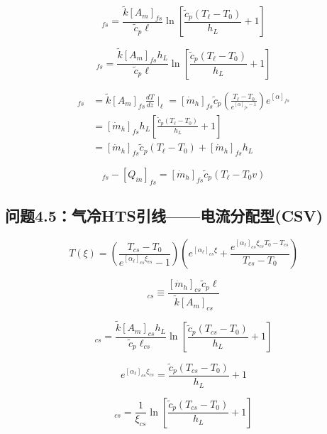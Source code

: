 \begin{equation}
[\dot{m}_h]_{fs}=\frac{\tilde{k}[A_m]_{fs}}{\tilde{c}_p\ell}\ln\left[\frac{\tilde{c}_p(T_\ell-T_0)}{h_L}+1\right]
\end{equation}

\begin{equation}%
[Q_{in}]_{fs}=\frac{\tilde{k}[A_m]_{fs}h_L}{\tilde{c}_p\ell}\ln\left[\frac{\tilde{c}_p(T_\ell-T_0)}{h_L}+1\right]
\end{equation}

\begin{align*}
[Q_\ell]_{fs}&=\tilde{k}[A_m]_{fs}\frac{dT}{dz}\mid_\ell=[\dot{m}_h]_{fs}\tilde{c}_p(\frac{T_\ell-T_0}{e^{[\alpha]_{fs}-1}})e^{[\alpha]_{fs}}\\
&=[\dot{m}_h]_{fs}h_L\left[\frac{\tilde{c}_p(T_\ell-T_0)}{h_L}+1\right]\\
&=[\dot{m}_h]_{fs}\tilde{c}_p(T_\ell-T_0)+[\dot{m}_h]_{fs}h_L
\end{align*}

\begin{equation}%
[Q_\ell]_{fs}-[Q_{in}]_{fs}=[\dot{m}_h]_{fs}\tilde{c}_p(T_\ell-T_0v)
\end{equation}




\subsection{问题4.5：气冷HTS引线——电流分配型(CSV)}
\begin{equation}%
T(\xi)=(\frac{T_{cs}-T_0}{e^{[\alpha_\ell]_{cs}\xi_{cs}}-1})(e^{[\alpha_\ell]_{cs}\xi}+\frac{e^{[\alpha_\ell]_{cs}\xi_{cs}T_0-T_{cs}}}{T_{cs}-T_0})
\end{equation}

\begin{equation}%
[\alpha_\ell]_{cs}\equiv\frac{[\dot{m}_h]_{cs}\tilde{c}_p\ell}{\tilde{k}[A_m]_{cs}}
\end{equation}

\begin{equation}%
[Q_{in}]_{cs}=\frac{\tilde{k}[A_m]_{cs}h_L}{\tilde{c}_p\ell_{cs}}\ln\left[\frac{\tilde{c}_p(T_{cs}-T_0)}{h_L}+1\right]
\end{equation}

\begin{equation}%
e^{[\alpha_\ell]_{cs}\xi_{cs}}=\frac{\tilde{c}_p(T_{cs}-T_0)}{h_L}+1
\end{equation}

\begin{equation}%
[\alpha_\ell]_{cs}=\frac{1}{\xi_{cs}}\ln\left[\frac{\tilde{c}_p(T_{cs}-T_0)}{h_L}+1\right]
\end{equation}

